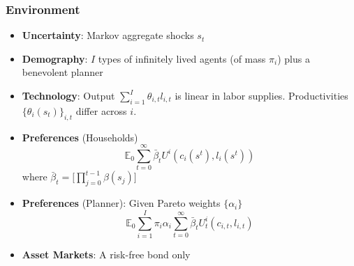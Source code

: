 \documentclass{beamer}
\begin{document}
\begin{frame}
 \frametitle{Environment}
 \begin{itemize}
 \item \textbf{Uncertainty}: Markov aggregate shocks $s_t$
  \item \textbf{Demography}: $I$ types of infinitely lived agents (of mass $\pi_i$)  plus a benevolent planner
  \item \textbf{Technology}: Output $\sum_{i=1}^I \theta_{i,t} l_{i,t}$ is linear in labor supplies. Productivities $\{\theta_i(s_t)\}_{i,t}$ differ across $i$.
  \item \textbf{Preferences }(Households)
  \begin{equation*}
\mathbb{E}_{0}\sum_{t=0}^{\infty } \bar{\beta}_t  U^{i}\left(
c_{i}(s^t),l_{i}(s^t)\right)  \label{utility lifetime}
\end{equation*}%
where
$\bar{\beta}_t=\bigl[\prod_{j=0}^{t-1} \beta(s_j) \bigr]$ %
\item \textbf{Preferences} (Planner): Given Pareto weights $\{\alpha_i\}$
\begin{equation*}
\mathbb{E}_{0}\sum_{i=1}^{I}\pi _{i}\alpha _{i}\sum_{t=0}^{\infty }\bar{\beta}_t U_{t}^{i}\left( c_{i,t},l_{i,t}\right)  \label{govmt objective}
\end{equation*}
  \item \textbf{Asset Markets}: A risk-free bond only
  \end{itemize}

\end{frame}
\end{document}

